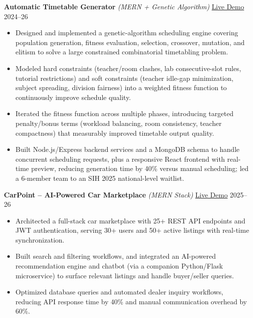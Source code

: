 \documentclass[10pt,a4paper]{article}
\begin{document}
\textbf{Automatic Timetable Generator} \textit{(MERN + Genetic Algorithm)} \hfill \href{https://academictimetable.vercel.app/}{Live Demo} \hfill 2024--26
\begin{itemize}
    \item Designed and implemented a genetic-algorithm scheduling engine covering population generation, fitness evaluation, selection, crossover, mutation, and elitism to solve a large constrained combinatorial timetabling problem.
    \item Modeled hard constraints (teacher/room clashes, lab consecutive-slot rules, tutorial restrictions) and soft constraints (teacher idle-gap minimization, subject spreading, division fairness) into a weighted fitness function to continuously improve schedule quality.
    \item Iterated the fitness function across multiple phases, introducing targeted penalty/bonus terms (workload balancing, room consistency, teacher compactness) that measurably improved timetable output quality.
    \item Built Node.js/Express backend services and a MongoDB schema to handle concurrent scheduling requests, plus a responsive React frontend with real-time preview, reducing generation time by 40\% versus manual scheduling; led a 6-member team to an SIH 2025 national-level waitlist.
\end{itemize}

\textbf{CarPoint -- AI-Powered Car Marketplace} \textit{(MERN Stack)} \hfill \href{https://car-point-swart.vercel.app/}{Live Demo} \hfill 2025--26
\begin{itemize}
    \item Architected a full-stack car marketplace with 25+ REST API endpoints and JWT authentication, serving 30+ users and 50+ active listings with real-time synchronization.
    \item Built search and filtering workflows, and integrated an AI-powered recommendation engine and chatbot (via a companion Python/Flask microservice) to surface relevant listings and handle buyer/seller queries.
    \item Optimized database queries and automated dealer inquiry workflows, reducing API response time by 40\% and manual communication overhead by 60\%.
\end{itemize}

\end{document}
